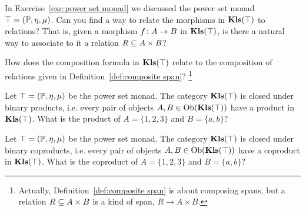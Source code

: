 \documentclass[CT4S-EN-RU]{subfiles}
\begin{document}
\begin{exampleRUS}\label{ex:experimenter matters 3}
\end{exampleRUS}

\begin{exerciseENG}\label{exc:kleisli powerset relations}
In Exercise~\ref{exc:power set monad} we discussed the power set monad $\top=(\PP,\eta,\mu)$.
\sexc Can you find a way to relate the morphisms in $\Kls(\top)$ to relations? That is, given a morphism $f\taking A\to B$ in $\Kls(\top)$, is there a natural way to associate to it a relation $R\ss A\times B$?
\item How does the composition formula in $\Kls(\top)$ relate to the composition of relations given in Definition~\ref{def:composite span}?
\footnote{Actually, Definition~\ref{def:composite span} is about composing spans, but a relation $R\ss A\times B$ is a kind of span, $R\to A\times B$.}
\endsexc
\end{exerciseENG}

\begin{exerciseRUS}\label{exc:kleisli powerset relations}
\end{exerciseRUS}

\begin{exerciseENG}
Let $\top=(\PP,\eta,\mu)$ be the power set monad. The category $\Kls(\top)$ is closed under binary products, i.e. every pair of objects $A,B\in\Ob(\Kls(\top))$ have a product in $\Kls(\top)$. What is the product of $A=\{1,2,3\}$ and $B=\{a,b\}$?
\end{exerciseENG}

\begin{exerciseRUS}
\end{exerciseRUS}

\begin{exerciseENG}
Let $\top=(\PP,\eta,\mu)$ be the power set monad. The category $\Kls(\top)$ is closed under binary coproducts, i.e. every pair of objects $A,B\in\Ob(\Kls(\top))$ have a coproduct in $\Kls(\top)$. What is the coproduct of $A=\{1,2,3\}$ and $B=\{a,b\}$?
\end{exerciseENG}

\begin{exerciseRUS}
\end{exerciseRUS}
\end{document}
